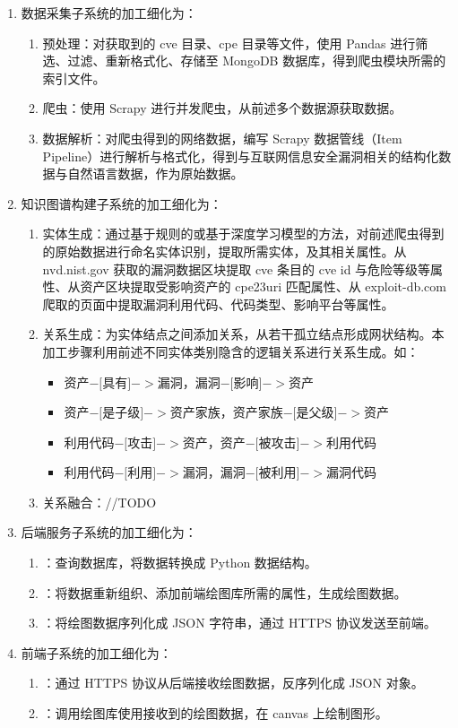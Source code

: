 \documentclass[a4paper,AutoFakeBold,oneside,12pt]{book}
\begin{document}
\begin{enumerate}
	\item 数据采集子系统的加工细化为：
	      \begin{enumerate}
		      \item 预处理：对获取到的 cve 目录、cpe 目录等文件，使用 Pandas 进行筛选、过滤、重新格式化、存储至 MongoDB 数据库，得到爬虫模块所需的索引文件。
		      \item 爬虫：使用 Scrapy 进行并发爬虫，从前述多个数据源获取数据。
		      \item 数据解析：对爬虫得到的网络数据，编写 Scrapy 数据管线（Item Pipeline）进行解析与格式化，得到与互联网信息安全漏洞相关的结构化数据与自然语言数据，作为原始数据。
	      \end{enumerate}
	\item 知识图谱构建子系统的加工细化为：
	      \begin{enumerate}
		      \item 实体生成：通过基于规则的或基于深度学习模型的方法，对前述爬虫得到的原始数据进行命名实体识别，提取所需实体，及其相关属性。从 nvd.nist.gov 获取的漏洞数据区块提取 cve 条目的 cve id 与危险等级等属性、从资产区块提取受影响资产的 cpe23uri 匹配属性、从 exploit-db.com 爬取的页面中提取漏洞利用代码、代码类型、影响平台等属性。
		      \item 关系生成：为实体结点之间添加关系，从若干孤立结点形成网状结构。本加工步骤利用前述不同实体类别隐含的逻辑关系进行关系生成。如：
		            \begin{itemize}
			            \item 资产$-[$具有$]->$漏洞，漏洞$-[$影响$]->$资产
			            \item 资产$-[$是子级$]->$资产家族，资产家族$-[$是父级$]->$资产
			            \item 利用代码$-[$攻击$]->$资产，资产$-[$被攻击$]->$利用代码
			            \item 利用代码$-[$利用$]->$漏洞，漏洞$-[$被利用$]->$漏洞代码
		            \end{itemize}
		      \item 关系融合：//TODO
	      \end{enumerate}
	\item 后端服务子系统的加工细化为：
	      \begin{enumerate}
		      \item ：查询数据库，将数据转换成 Python 数据结构。
		      \item ：将数据重新组织、添加前端绘图库所需的属性，生成绘图数据。
		      \item ：将绘图数据序列化成 JSON 字符串，通过 HTTPS 协议发送至前端。
	      \end{enumerate}
	\item 前端子系统的加工细化为：
	      \begin{enumerate}
		      \item ：通过 HTTPS 协议从后端接收绘图数据，反序列化成 JSON 对象。
		      \item ：调用绘图库使用接收到的绘图数据，在 canvas 上绘制图形。
	      \end{enumerate}
\end{enumerate}
\end{document}
